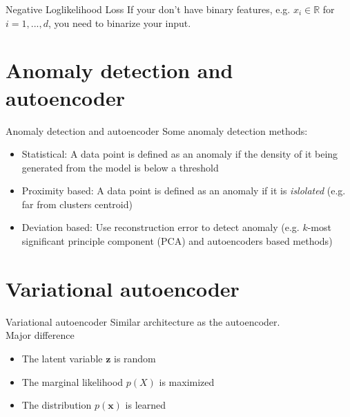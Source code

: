 \documentclass{beamer}
\newcommand{\real}{\mathbb{R}}
\begin{document}
\begin{frame}{Negative Loglikelihood Loss}
If your don't have binary features, e.g. $x_i\in \real$ for $i=1,...,d$, you need to binarize your input. 
\end{frame}

\section{Anomaly detection and autoencoder}
\begin{frame}{Anomaly detection and autoencoder}
Some anomaly detection methods:
\begin{itemize}
	\item Statistical: A data point is defined as an anomaly if the density of it being generated from the model is below a threshold
	\item Proximity based: A data point is defined as an anomaly if it is \textit{islolated} (e.g. far from clusters centroid)
	\item Deviation based: Use reconstruction error to detect anomaly (e.g. $k$-most significant principle component (PCA) and autoencoders based methods)
\end{itemize}
\end{frame}

\section{Variational autoencoder}

\begin{frame}{Variational autoencoder}
Similar architecture as the autoencoder.\\

Major difference
\begin{itemize}
	\item The latent variable $\bm{z}$ is random
	\item The marginal likelihood $p(X)$ is maximized
	\item The distribution $p(\bm{x})$ is learned
\end{itemize}
\end{frame}
\end{document}
